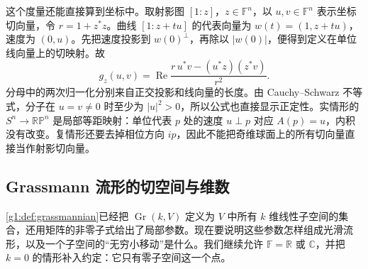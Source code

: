 这个度量还能直接算到坐标中。取射影图 \([1:z]\)，\(z\in\mathbb F^n\)，以 \(u,v\in\mathbb F^n\) 表示坐标切向量，令 \(r=1+z^*z\)。曲线 \([1:z+tu]\) 的代表向量为 \(w(t)=(1,z+tu)\)，速度为 \((0,u)\)。先把速度投影到 \(w(0)^\perp\)，再除以 \(|w(0)|\)，便得到定义在单位线向量上的切映射。故
\begin{equation}\label{g1:eq:projective-invariant-metric}
	g_z(u,v)=\operatorname{Re}\frac{r\,u^*v-(u^*z)(z^*v)}{r^2}.
\end{equation}
分母中的两次归一化分别来自正交投影和线向量的长度。由 Cauchy--Schwarz 不等式，分子在 \(u=v\ne0\) 时至少为 \(|u|^2>0\)，所以公式也直接显示正定性。实情形的 \(S^n\to\mathbb{RP}^n\) 是局部等距映射：单位代表 \(p\) 处的速度 \(u\perp p\) 对应 \(A(p)=u\)，内积没有改变。复情形还要去掉相位方向 \(ip\)，因此不能把奇维球面上的所有切向量直接当作射影切向量。

\subsection{Grassmann 流形的切空间与维数}
\label{g1:subsec:1703:05}

\cref{g1:def:grassmannian}已经把 \(\operatorname{Gr}(k,V)\) 定义为 \(V\) 中所有 \(k\) 维线性子空间的集合，还用矩阵的非零子式给出了局部参数。现在要说明这些参数怎样组成光滑流形，以及一个子空间的“无穷小移动”是什么。我们继续允许 \(\mathbb F=\mathbb R\) 或 \(\mathbb C\)，并把 \(k=0\) 的情形补入约定：它只有零子空间这一个点。

